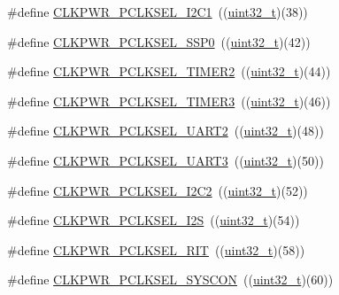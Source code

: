 \begin{DoxyCompactItemize}
\#define \hyperlink{group___c_l_k_p_w_r___public___macros_gab662479578bb2af89f683e17517b9a5e}{C\+L\+K\+P\+W\+R\+\_\+\+P\+C\+L\+K\+S\+E\+L\+\_\+\+I2\+C1}~((\hyperlink{_p_e___types_8h_a33594304e786b158f3fb30289278f5af}{uint32\+\_\+t})(38))
\item 
\#define \hyperlink{group___c_l_k_p_w_r___public___macros_gada2d54badb0a1592f68643aba04cb4ba}{C\+L\+K\+P\+W\+R\+\_\+\+P\+C\+L\+K\+S\+E\+L\+\_\+\+S\+S\+P0}~((\hyperlink{_p_e___types_8h_a33594304e786b158f3fb30289278f5af}{uint32\+\_\+t})(42))
\item 
\#define \hyperlink{group___c_l_k_p_w_r___public___macros_gafb146ae5ab7a0fbc2c95924f3a50456d}{C\+L\+K\+P\+W\+R\+\_\+\+P\+C\+L\+K\+S\+E\+L\+\_\+\+T\+I\+M\+E\+R2}~((\hyperlink{_p_e___types_8h_a33594304e786b158f3fb30289278f5af}{uint32\+\_\+t})(44))
\item 
\#define \hyperlink{group___c_l_k_p_w_r___public___macros_ga0df581997c3365eee4a5a0503e513066}{C\+L\+K\+P\+W\+R\+\_\+\+P\+C\+L\+K\+S\+E\+L\+\_\+\+T\+I\+M\+E\+R3}~((\hyperlink{_p_e___types_8h_a33594304e786b158f3fb30289278f5af}{uint32\+\_\+t})(46))
\item 
\#define \hyperlink{group___c_l_k_p_w_r___public___macros_ga2b7eb179fdd09c99ddadac8c4d144142}{C\+L\+K\+P\+W\+R\+\_\+\+P\+C\+L\+K\+S\+E\+L\+\_\+\+U\+A\+R\+T2}~((\hyperlink{_p_e___types_8h_a33594304e786b158f3fb30289278f5af}{uint32\+\_\+t})(48))
\item 
\#define \hyperlink{group___c_l_k_p_w_r___public___macros_ga47e9c387422d28ed7d667b7a4abd9096}{C\+L\+K\+P\+W\+R\+\_\+\+P\+C\+L\+K\+S\+E\+L\+\_\+\+U\+A\+R\+T3}~((\hyperlink{_p_e___types_8h_a33594304e786b158f3fb30289278f5af}{uint32\+\_\+t})(50))
\item 
\#define \hyperlink{group___c_l_k_p_w_r___public___macros_gafbf149f2011d8691c7e1b9c3fe1383f4}{C\+L\+K\+P\+W\+R\+\_\+\+P\+C\+L\+K\+S\+E\+L\+\_\+\+I2\+C2}~((\hyperlink{_p_e___types_8h_a33594304e786b158f3fb30289278f5af}{uint32\+\_\+t})(52))
\item 
\#define \hyperlink{group___c_l_k_p_w_r___public___macros_gabaeef97fdbabc0fee54c07786ee6e1ba}{C\+L\+K\+P\+W\+R\+\_\+\+P\+C\+L\+K\+S\+E\+L\+\_\+\+I2S}~((\hyperlink{_p_e___types_8h_a33594304e786b158f3fb30289278f5af}{uint32\+\_\+t})(54))
\item 
\#define \hyperlink{group___c_l_k_p_w_r___public___macros_ga7017b827f2ec5d3b822371ab3eb43bd9}{C\+L\+K\+P\+W\+R\+\_\+\+P\+C\+L\+K\+S\+E\+L\+\_\+\+R\+IT}~((\hyperlink{_p_e___types_8h_a33594304e786b158f3fb30289278f5af}{uint32\+\_\+t})(58))
\item 
\#define \hyperlink{group___c_l_k_p_w_r___public___macros_ga5e87768ef5afcdeb8e4c2a9085fa381e}{C\+L\+K\+P\+W\+R\+\_\+\+P\+C\+L\+K\+S\+E\+L\+\_\+\+S\+Y\+S\+C\+ON}~((\hyperlink{_p_e___types_8h_a33594304e786b158f3fb30289278f5af}{uint32\+\_\+t})(60))

\end{DoxyCompactItemize}
